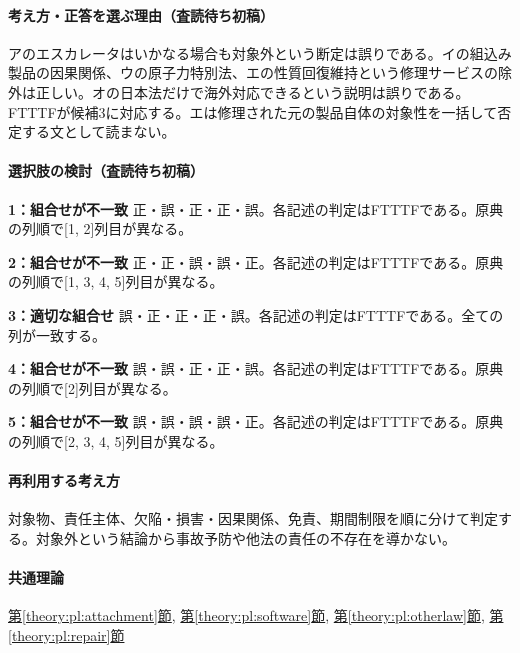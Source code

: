 \paragraph{考え方・正答を選ぶ理由（査読待ち初稿）} アのエスカレータはいかなる場合も対象外という断定は誤りである。イの組込み製品の因果関係、ウの原子力特別法、エの性質回復維持という修理サービスの除外は正しい。オの日本法だけで海外対応できるという説明は誤りである。FTTTFが候補3に対応する。エは修理された元の製品自体の対象性を一括して否定する文として読まない。

\paragraph{選択肢の検討（査読待ち初稿）}\mbox{}\par

\noindent\textbf{1：組合せが不一致} 正・誤・正・正・誤。各記述の判定はFTTTFである。原典の列順で[1, 2]列目が異なる。\par

\noindent\textbf{2：組合せが不一致} 正・正・誤・誤・正。各記述の判定はFTTTFである。原典の列順で[1, 3, 4, 5]列目が異なる。\par

\noindent\textbf{3：適切な組合せ} 誤・正・正・正・誤。各記述の判定はFTTTFである。全ての列が一致する。\par

\noindent\textbf{4：組合せが不一致} 誤・誤・正・正・誤。各記述の判定はFTTTFである。原典の列順で[2]列目が異なる。\par

\noindent\textbf{5：組合せが不一致} 誤・誤・誤・誤・正。各記述の判定はFTTTFである。原典の列順で[2, 3, 4, 5]列目が異なる。\par

\paragraph{再利用する考え方} 対象物、責任主体、欠陥・損害・因果関係、免責、期間制限を順に分けて判定する。対象外という結論から事故予防や他法の責任の不存在を導かない。

\paragraph{共通理論} \hyperref[theory:pl:attachment]{第\ref*{theory:pl:attachment}節}, \hyperref[theory:pl:software]{第\ref*{theory:pl:software}節}, \hyperref[theory:pl:otherlaw]{第\ref*{theory:pl:otherlaw}節}, \hyperref[theory:pl:repair]{第\ref*{theory:pl:repair}節}

